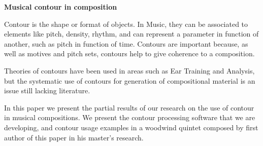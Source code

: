 \documentclass[12pt]{article}
\begin{document}
\begin{center}
  \Large \textbf{\textsf{Musical contour in composition}}
\end{center}

\thispagestyle{empty}

\doublespacing

Contour is the shape or format of objects. In Music, they can be
associated to elements like pitch, density, rhythm, and can represent
a parameter in function of another, such as pitch in function of time.
Contours are important because, as well as motives and pitch sets,
contours help to give coherence to a composition.

Theories of contours have been used in areas such as Ear Training and
Analysis, but the systematic use of contours for generation of
compositional material is an issue still lacking literature.

In this paper we present the partial results of our research on the
use of contour in musical compositions. We present the contour
processing software that we are developing, and contour usage examples
in a woodwind quintet composed by first author of this paper in his
master's research.
\end{document}
